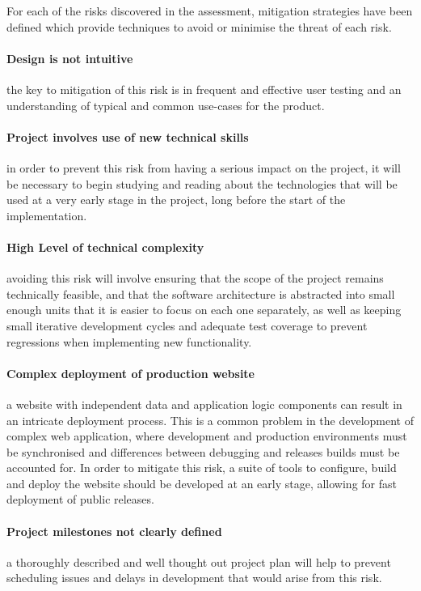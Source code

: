 \documentclass[12pt,a4paper]{article}
\begin{document}
For each of the risks discovered in the assessment, mitigation strategies have
been defined which provide techniques to avoid or minimise the threat of each
risk.

\paragraph{Design is not intuitive} the key to mitigation of this risk is in frequent and
effective user testing and an understanding of typical and common use-cases for
the product.

\paragraph{Project involves use of new technical skills} in order to prevent this risk
from having a serious impact on the project, it will be necessary to begin
studying and reading about the technologies that will be used at a very early
stage in the project, long before the start of the implementation.

\paragraph{High Level of technical complexity} avoiding this risk will involve ensuring
that the scope of the project remains technically feasible, and that the
software architecture is abstracted into small enough units that it is easier to
focus on each one separately, as well as keeping small iterative development
cycles and adequate test coverage to prevent regressions when implementing new
functionality.

\paragraph{Complex deployment of production website} a website with independent
data and application logic components can result in an intricate deployment
process. This is a common problem in the development of complex web application,
where development and production environments must be synchronised and
differences between debugging and releases builds must be accounted for. In
order to mitigate this risk, a suite of tools to configure, build and deploy the
website should be developed at an early stage, allowing for fast deployment of
public releases.

\paragraph{Project milestones not clearly defined} a thoroughly described and well
thought out project plan will help to prevent scheduling issues and delays in
development that would arise from this risk.
\end{document}

